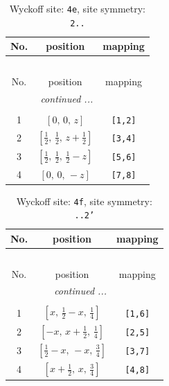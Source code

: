 \documentclass[fleqn,8pt]{jsarticle}
\begin{document}
\begin{longtable}{ccc}
\caption{Wyckoff site: {\tt 4e}, site symmetry: {\tt 2..}}
 \\
 \hline \hline
No. & position & mapping \\ \hline \endfirsthead

\multicolumn{2}{l}{\tablename\ \thetable{}} \\
 \hline \hline
No. & position & mapping \\ \hline \endhead

 \hline \hline
\multicolumn{2}{r}{\footnotesize\it continued ...} \\ \endfoot

 \hline \hline
\multicolumn{2}{r}{} \\ \endlastfoot

1 & $\left[ 0,\, 0,\, z \right]$ & {\tt [1,2]} \\ \hline
2 & $\left[ \frac{1}{2},\, \frac{1}{2},\, z + \frac{1}{2} \right]$ & {\tt [3,4]} \\ \hline
3 & $\left[ \frac{1}{2},\, \frac{1}{2},\, \frac{1}{2} - z \right]$ & {\tt [5,6]} \\ \hline
4 & $\left[ 0,\, 0,\, - z \right]$ & {\tt [7,8]} \\
\end{longtable}
\renewcommand{\arraystretch}{1.2}
\begin{longtable}{ccc}
\caption{Wyckoff site: {\tt 4f}, site symmetry: {\tt ..2'}}
 \\
 \hline \hline
No. & position & mapping \\ \hline \endfirsthead

\multicolumn{2}{l}{\tablename\ \thetable{}} \\
 \hline \hline
No. & position & mapping \\ \hline \endhead

 \hline \hline
\multicolumn{2}{r}{\footnotesize\it continued ...} \\ \endfoot

 \hline \hline
\multicolumn{2}{r}{} \\ \endlastfoot

1 & $\left[ x,\, \frac{1}{2} - x,\, \frac{1}{4} \right]$ & {\tt [1,6]} \\ \hline
2 & $\left[ - x,\, x + \frac{1}{2},\, \frac{1}{4} \right]$ & {\tt [2,5]} \\ \hline
3 & $\left[ \frac{1}{2} - x,\, - x,\, \frac{3}{4} \right]$ & {\tt [3,7]} \\ \hline
4 & $\left[ x + \frac{1}{2},\, x,\, \frac{3}{4} \right]$ & {\tt [4,8]} \\
\end{longtable}
\end{document}

